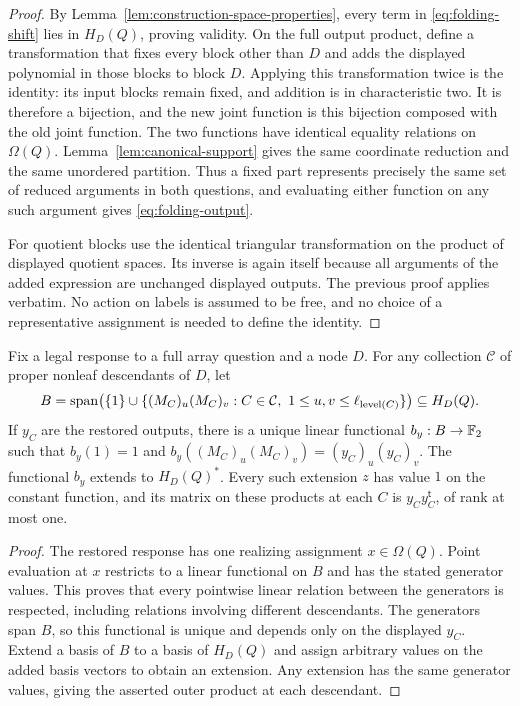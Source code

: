 \begin{proof}
By Lemma~\ref{lem:construction-space-properties}, every term in
\eqref{eq:folding-shift} lies in $H_D(Q)$, proving validity.
On the full output product, define a transformation that fixes every
block other than $D$ and adds the displayed polynomial in those blocks
to block $D$.  Applying this transformation twice is the identity:
its input blocks remain fixed, and addition is in characteristic two.
It is therefore a bijection, and the new joint function is this bijection
composed with the old joint function.  The two functions have identical
equality relations on $\Omega(Q)$.  Lemma~\ref{lem:canonical-support}
gives the same coordinate reduction and the same unordered partition.
Thus a fixed part represents precisely the same set of reduced arguments
in both questions, and evaluating either function on any such argument
gives \eqref{eq:folding-output}.

For quotient blocks use the identical triangular transformation on the
product of displayed quotient spaces.  Its inverse is again itself
because all arguments of the added expression are unchanged displayed
outputs.  The previous proof applies verbatim.  No action on labels is
assumed to be free, and no choice of a representative assignment is
needed to define the identity.
\end{proof}

\begin{lemma}
\label{lem:joint-evaluation}
Fix a legal response to a full array question and a node $D$.
For any collection $\mathcal C$ of proper nonleaf descendants of $D$, let
\[
 B=\operatorname{span}\bigl(\{1\}\cup
       \{(M_C)_u(M_C)_v:C\in\mathcal C,\ 1\leq u,v\leq
                                    \ell_{\operatorname{level}(C)}\}\bigr)
       \subseteq H_D(Q).
\]
If $y_C$ are the restored outputs, there is a unique linear functional
$b_y:B\to\mathbb F_2$ such that $b_y(1)=1$ and
$b_y((M_C)_u(M_C)_v)=(y_C)_u(y_C)_v$.
The functional $b_y$ extends to $H_D(Q)^*$.  Every such extension $z$ has
value $1$ on the constant function, and its matrix on these products at each $C$ is
$y_Cy_C^{\mathsf t}$, of rank at most one.
\end{lemma}
\begin{proof}
The restored response has one realizing assignment $x\in\Omega(Q)$.
Point evaluation at $x$ restricts to a linear functional on $B$ and has
the stated generator values.  This proves that every pointwise linear
relation between the generators is respected, including relations
involving different descendants.  The generators span $B$, so this
functional is unique and depends only on the displayed $y_C$.
Extend a basis of $B$ to a basis of $H_D(Q)$ and assign arbitrary values
on the added basis vectors to obtain an extension.  Any extension has
the same generator values, giving the asserted outer product at each descendant.
\end{proof}


